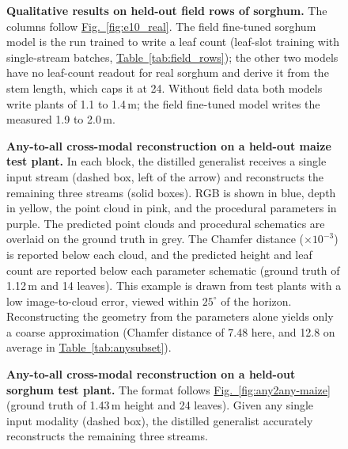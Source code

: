 \documentclass[10pt,twocolumn,letterpaper]{article}
\newcommand{\updtwo}[1]{#1}
\newcommand{\figref}[1]{\hyperref[#1]{Fig.~\ref*{#1}}}
\newcommand{\tabref}[1]{\hyperref[#1]{Table~\ref*{#1}}}
\begin{document}
\begin{figure}[t]
  \centering
  \resizebox{\textwidth}{!}{}
  \caption{\updtwo{\textbf{Qualitative results on held-out field rows of sorghum.} The columns follow \figref{fig:e10_real}. The field fine-tuned sorghum model is the run trained to write a leaf count (leaf-slot training with single-stream batches, \tabref{tab:field_rows}); the other two models have no leaf-count readout for real sorghum and derive it from the stem length, which caps it at 24. Without field data both models write plants of 1.1 to 1.4\,m; the field fine-tuned model writes the measured 1.9 to 2.0\,m.}}
  \label{fig:e10_real_sorghum}


\end{figure}

\begin{figure}[t]
  \centering
  \resizebox{\linewidth}{!}{}
  \caption{\textbf{Any-to-all cross-modal reconstruction on a held-out maize test plant.} In each block, the distilled generalist receives a single input stream (dashed box, left of the arrow) and reconstructs the remaining three streams (solid boxes). RGB is shown in blue, depth in yellow, the point cloud in pink, and the procedural parameters in purple. The predicted point clouds and procedural schematics are overlaid on the ground truth in grey. The Chamfer distance ($\times 10^{-3}$) is reported below each cloud, and the predicted height and leaf count are reported below each parameter schematic (ground truth of 1.12\,m and 14 leaves). This example is drawn from test plants with a low image-to-cloud error, viewed within $25^\circ$ of the horizon. Reconstructing the geometry from the parameters alone yields only a coarse approximation (Chamfer distance of 7.48 here, and 12.8 on average in \tabref{tab:anysubset}).}
  \label{fig:any2any-maize}\label{fig:any2any}
\end{figure}

\begin{figure}[t]
  \centering
  \resizebox{\linewidth}{!}{}
  \caption{\textbf{Any-to-all cross-modal reconstruction on a held-out sorghum test plant.} The format follows \figref{fig:any2any-maize} (ground truth of 1.43\,m height and 24 leaves). Given any single input modality (dashed box), the distilled generalist accurately reconstructs the remaining three streams.}
  \label{fig:any2any-sorghum}
\end{figure}
\end{document}
